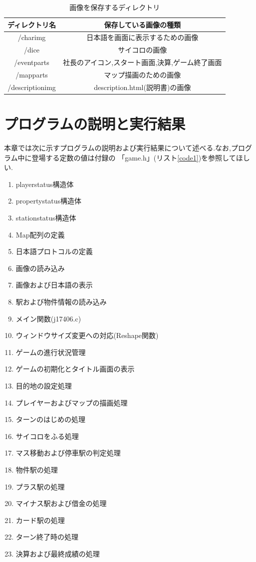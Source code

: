 \documentclass[a4j]{jarticle}
\begin{document}
      \begin{table}[H]
        \caption{画像を保存するディレクトリ}
      \label{imgdir}
      \begin{center}
          \begin{tabular}{c|c}\hline
            ディレクトリ名 & 保存している画像の種類 \\ \hline \hline
            /charimg & 日本語を画面に表示するための画像 \\
            /dice & サイコロの画像 \\ 
            /eventparts & 社長のアイコン,スタート画面,決算,ゲーム終了画面 \\ 
            /mapparts & マップ描画のための画像 \\
            /descriptionimg & description.html(説明書)の画像 \\ \hline
          \end{tabular}
      \end{center}
      \end{table}
        
    
    \section{プログラムの説明と実行結果}
    本章では次に示すプログラムの説明および実行結果について述べる.なお,プログラム中に登場する定数の値は付録の
    「game.h」(リスト\ref{code1})を参照してほしい.
    \begin{enumerate}
        \item playerstatus構造体
        \item propertystatus構造体
        \item stationstatus構造体
        \item Map配列の定義
        \item 日本語プロトコルの定義
        \item 画像の読み込み
        \item 画像および日本語の表示
        \item 駅および物件情報の読み込み
        \item メイン関数(j17406.c)
        \item ウィンドウサイズ変更への対応(Reshape関数)
        \item ゲームの進行状況管理
        \item ゲームの初期化とタイトル画面の表示
        \item 目的地の設定処理
        \item プレイヤーおよびマップの描画処理
        \item ターンのはじめの処理
        \item サイコロをふる処理
        \item マス移動および停車駅の判定処理
        \item 物件駅の処理
        \item プラス駅の処理
        \item マイナス駅および借金の処理
        \item カード駅の処理
        \item ターン終了時の処理
        \item 決算および最終成績の処理
    \end{enumerate}    
\end{document}
